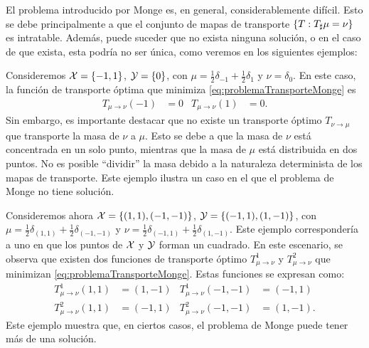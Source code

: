 El problema introducido por Monge \cite{monge1781memoire} es, en general, considerablemente difícil. Esto se debe principalmente a que el conjunto de mapas de transporte $\left\{ T : {T}_{\sharp} \mu = \nu \right\}$ es intratable. Además, puede suceder que no exista ninguna solución, o en el caso de que exista, esta podría no ser única, como veremos en los siguientes ejemplos:

\begin{example}\label{ex:problemaDeMongeSinSolucion}
    Consideremos $\mathcal{X} = \left\{ -1, 1 \right\}$, $\mathcal{Y} = \left\{ 0 \right\}$, con $\mu = \frac{1}{2} \delta_{-1} + \frac{1}{2} \delta_{1}$ y $\nu = \delta_0$. En este caso, la función de transporte óptima que minimiza \eqref{eq:problemaTransporteMonge} es
    \begin{align*}
        T_{\mu \to \nu}(-1) & = 0 & T_{\mu \to \nu}(1) & = 0.
    \end{align*}
    Sin embargo, es importante destacar que no existe un transporte óptimo $T_{\nu \to \mu}$ que transporte la masa de $\nu$ a $\mu$. Esto se debe a que la masa de $\nu$ está concentrada en un solo punto, mientras que la masa de $\mu$ está distribuida en dos puntos. No es posible ``dividir'' la masa debido a la naturaleza determinista de los mapas de transporte. Este ejemplo ilustra un caso en el que el problema de Monge no tiene solución.
\end{example}

\begin{example}\label{ex:problemaDeMongeMultipleSolucion}
    Consideremos ahora $\mathcal{X} = \left\{ (1, 1), (-1, -1) \right\}$, $\mathcal{Y} = \left\{ (-1, 1), (1, -1) \right\}$, con $\mu = \frac{1}{2} \delta_{(1, 1)} + \frac{1}{2} \delta_{(-1, -1)}$ y $\nu = \frac{1}{2} \delta_{(-1, 1)} + \frac{1}{2} \delta_{(1, -1)}$. Este ejemplo correspondería a uno en que los puntos de $\mathcal{X}$ y $\mathcal{Y}$ forman un cuadrado. En este escenario, se observa que existen dos funciones de transporte óptimo $T^1_{\mu\to\nu}$ y $T^2_{\mu\to\nu}$ que minimizan \eqref{eq:problemaTransporteMonge}. Estas funciones se expresan como:
    \begin{align*}
        T^1_{\mu\to\nu}(1, 1) & = (1, -1) & T^1_{\mu\to\nu}(-1, -1) & = (-1, 1)  \\
        T^2_{\mu\to\nu}(1, 1) & = (-1, 1) & T^2_{\mu\to\nu}(-1, -1) & = (1, -1).
    \end{align*}
    Este ejemplo muestra que, en ciertos casos, el problema de Monge puede tener más de una solución.
\end{example}



